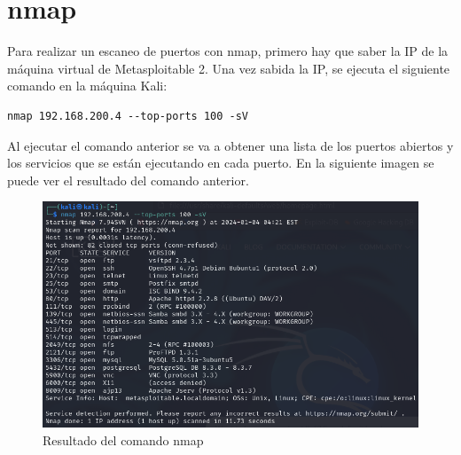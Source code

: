 \documentclass[11pt]{report}
\begin{document}
\section{nmap}
Para realizar un escaneo de puertos con nmap, primero hay que saber la IP de la máquina virtual de Metasploitable 2. Una vez sabida la IP, se ejecuta el siguiente comando en la máquina Kali:
\begin{verbatim}
nmap 192.168.200.4 --top-ports 100 -sV
\end{verbatim}

Al ejecutar el comando anterior se va a obtener una lista de los puertos abiertos y los servicios que se están ejecutando en cada puerto. En la siguiente imagen se puede ver el resultado del comando anterior.
\begin{figure}[H]
  \centering
  \includegraphics[scale=0.55]{img/nmap.png}
  \caption{Resultado del comando nmap}
  \label{fig:Resultado del comando nmap}
\end{figure}


\end{document}
